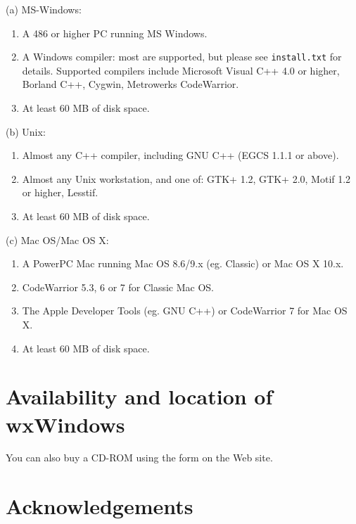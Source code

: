 (a) MS-Windows:

\begin{enumerate}\itemsep=0pt
\item A 486 or higher PC running MS Windows.
\item A Windows compiler: most are supported, but please see {\tt install.txt} for
details. Supported compilers include Microsoft Visual C++ 4.0 or higher, Borland C++, Cygwin,
Metrowerks CodeWarrior.
\item At least 60 MB of disk space.
\end{enumerate}

(b) Unix:

\begin{enumerate}\itemsep=0pt
\item Almost any C++ compiler, including GNU C++ (EGCS 1.1.1 or above).
\item Almost any Unix workstation, and one of: GTK+ 1.2, GTK+ 2.0, Motif 1.2 or higher, Lesstif.
\item At least 60 MB of disk space.
\end{enumerate}

(c) Mac OS/Mac OS X:

\begin{enumerate}\itemsep=0pt
\item A PowerPC Mac running Mac OS 8.6/9.x (eg. Classic) or Mac OS X 10.x.
\item CodeWarrior 5.3, 6 or 7 for Classic Mac OS.
\item The Apple Developer Tools (eg. GNU C++) or CodeWarrior 7 for Mac OS X.
\item At least 60 MB of disk space.
\end{enumerate}

\section{Availability and location of wxWindows}


You can also buy a CD-ROM using the form on the Web site.

\section{Acknowledgements}

